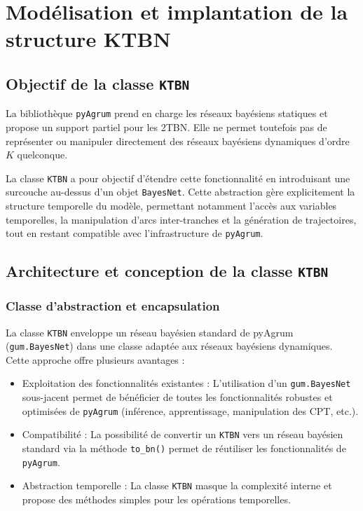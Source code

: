 \documentclass{article}
\begin{document}
\section{Modélisation et implantation de la structure KTBN}

\subsection{Objectif de la classe \texttt{KTBN}}

La bibliothèque \texttt{pyAgrum} prend en charge les réseaux bayésiens statiques et propose un support partiel
pour les 2TBN. Elle ne permet toutefois pas de représenter ou manipuler directement des réseaux bayésiens
dynamiques d'ordre $K$ quelconque.

La classe \texttt{KTBN} a pour objectif d'étendre cette fonctionnalité en introduisant une surcouche au-dessus
d'un objet \texttt{BayesNet}. Cette abstraction gère explicitement la structure temporelle du modèle, permettant
notamment l'accès aux variables temporelles, la manipulation d'arcs inter-tranches et la génération de trajectoires,
tout en restant compatible avec l'infrastructure de \texttt{pyAgrum}.


\subsection{Architecture et conception de la classe \texttt{KTBN}}

\subsubsection{Classe d'abstraction et encapsulation}

La classe \texttt{KTBN} enveloppe un réseau bayésien standard de pyAgrum (\texttt{gum.BayesNet}) dans une classe
adaptée aux réseaux bayésiens dynamiques. Cette approche offre plusieurs avantages :

\begin{itemize}
    \item Exploitation des fonctionnalités existantes :  L'utilisation d'un \texttt{gum.BayesNet} sous-jacent
          permet de bénéficier de toutes les fonctionnalités robustes et optimisées de \texttt{pyAgrum} (inférence,
          apprentissage, manipulation des CPT, etc.).
    \item Compatibilité : La possibilité de convertir un \texttt{KTBN} vers un réseau bayésien standard via
          la méthode \texttt{to\_bn()} permet de réutiliser les fonctionnalités de \texttt{pyAgrum}.
    \item Abstraction temporelle : La classe \texttt{KTBN} masque la complexité interne et propose des méthodes
          simples pour les opérations temporelles.
\end{itemize}
\end{document}
